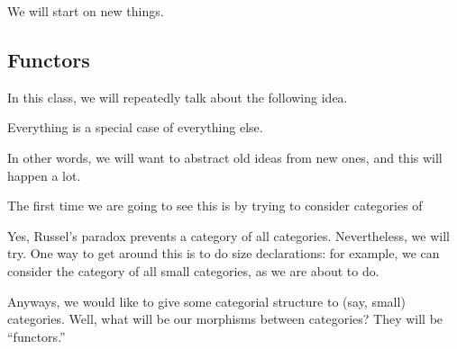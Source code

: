 
We will start on new things.

\subsection{Functors}
In this class, we will repeatedly talk about the following idea.
\begin{idea}
	Everything is a special case of everything else.
\end{idea}
In other words, we will want to abstract old ideas from new ones, and this will happen a lot.

The first time we are going to see this is by trying to consider categories of 
\begin{remark}
	Yes, Russel's paradox prevents a category of all categories. Nevertheless, we will try. One way to get around this is to do size declarations: for example, we can consider the category of all small categories, as we are about to do.
\end{remark}
Anyways, we would like to give some categorial structure to (say, small) categories. Well, what will be our morphisms between categories? They will be ``functors.''

